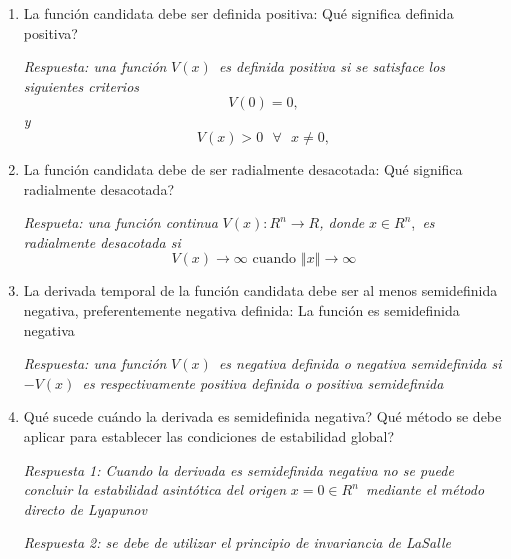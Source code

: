 \documentclass[letterpaper,11pt]{article}
\begin{document}
\begin{enumerate}
\item La funci\'{o}n candidata debe ser definida positiva: \textquestiondown %
Qu\'{e} significa definida positiva?

\emph{Respuesta: una funci\'{o}n }$V\left( x\right) $\emph{\ es definida
positiva si se satisface los siguientes criterios}%
\begin{equation*}
V\left( 0\right) =0,
\end{equation*}%
\emph{y}%
\begin{equation*}
V\left( x\right) >0\text{ }\forall \text{ }x\neq 0,
\end{equation*}

\item La funci\'{o}n candidata debe de ser radialmente desacotada: 
\textquestiondown Qu\'{e} significa radialmente desacotada?

\emph{Respueta: una funci\'{o}n continua }$V\left( x\right)
:R^{n}\rightarrow R$\emph{, donde} $x\in R^{n}$,\emph{\ es radialmente
desacotada si}%
\begin{equation*}
V\left( x\right) \rightarrow \infty \text{ cuando }\left\Vert x\right\Vert
\rightarrow \infty
\end{equation*}

\item La derivada temporal de la funci\'{o}n candidata debe ser al menos
semidefinida negativa, preferentemente negativa definida: La funci\'{o}n es
semidefinida negativa

\emph{Respuesta: una funci\'{o}n }$V\left( x\right) $\emph{\ es negativa
definida o negativa semidefinida si }$-V\left( x\right) $\emph{\ es
respectivamente positiva definida o positiva semidefinida}

\item \textquestiondown Qu\'{e} sucede cu\'{a}ndo la derivada es
semidefinida negativa? \textquestiondown Qu\'{e} m\'{e}todo se debe aplicar
para establecer las condiciones de estabilidad global?

\emph{Respuesta 1: Cuando la derivada es semidefinida negativa no se puede
concluir la estabilidad asint\'{o}tica del origen }$x=0\in R^{n}$\emph{\
mediante el m\'{e}todo directo de Lyapunov}

\emph{Respuesta 2: se debe de utilizar el principio de invariancia de LaSalle%
}
\end{enumerate}
\end{document}
